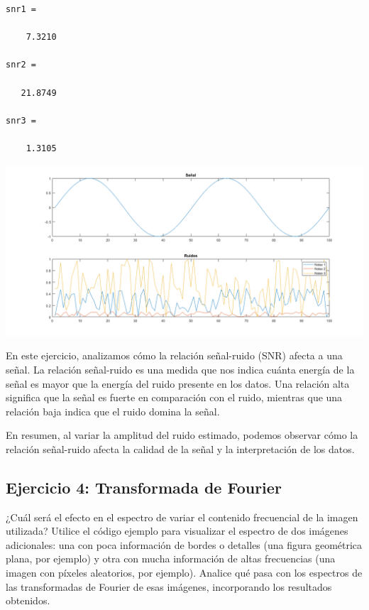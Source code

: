 \documentclass{article}
\begin{document}
\begin{lstlisting}[style=mystyle]
snr1 =

    7.3210

snr2 =

   21.8749

snr3 =

    1.3105
\end{lstlisting}


\begin{minipage}{\linewidth}
  \centering
  \includegraphics[width=1.0\textwidth]{imgs/p3.png}
  \label{referenciarImagenAca}
\end{minipage}

En este ejercicio, analizamos cómo la relación señal-ruido (SNR) afecta a una señal. La relación señal-ruido es una medida que nos indica cuánta energía de la señal es mayor que la energía del ruido presente en los datos. Una relación alta significa que la señal es fuerte en comparación con el ruido, mientras que una relación baja indica que el ruido domina la señal.

En resumen, al variar la amplitud del ruido estimado, podemos observar cómo la relación señal-ruido afecta la calidad de la señal y la interpretación de los datos.

\subsection*{Ejercicio 4: Transformada de Fourier}

¿Cuál será el efecto en el espectro de variar el contenido frecuencial de la imagen utilizada? Utilice el código ejemplo para visualizar el espectro de dos imágenes adicionales: una con poca información de bordes o detalles (una figura geométrica plana, por ejemplo) y otra con mucha información de altas frecuencias (una imagen con píxeles aleatorios, por ejemplo). Analice qué pasa con los espectros de las transformadas de Fourier de esas imágenes, incorporando los resultados obtenidos.
\end{document}
